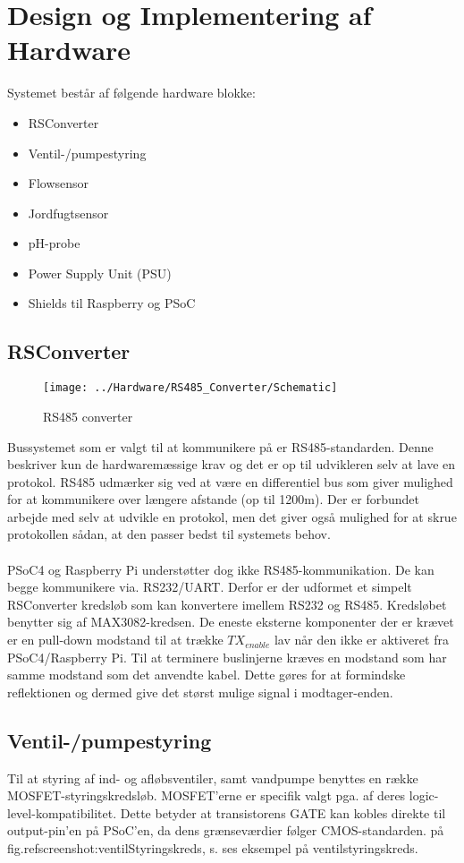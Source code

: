 \section{Design og Implementering af Hardware}
Systemet består af følgende hardware blokke:
\begin{itemize}
\item RSConverter
\item Ventil-/pumpestyring
\item Flowsensor
\item Jordfugtsensor
\item pH-probe
\item Power Supply Unit (PSU)
\item Shields til Raspberry og PSoC
\end{itemize}

\subsection{RSConverter}
\begin{figure}[H]
	\centering
	\texttt{[image: ../Hardware/RS485\_Converter/Schematic]}
	\caption{RS485 converter}
	\label{photo:RS485converter}
\end{figure}

Bussystemet som er valgt til at kommunikere på er RS485-standarden. Denne beskriver kun de hardwaremæssige krav og det er op til udvikleren selv at lave en protokol. RS485 udmærker sig ved at være en differentiel bus som giver mulighed for at kommunikere over længere afstande (op til 1200m). Der er forbundet arbejde med selv at udvikle en protokol, men det giver også mulighed for at skrue protokollen sådan, at den passer bedst til systemets behov.
\\\\
PSoC4 og Raspberry Pi understøtter dog ikke RS485-kommunikation. De kan begge kommunikere via. RS232/UART. Derfor er der udformet et simpelt RSConverter kredsløb som kan konvertere imellem RS232 og RS485. Kredsløbet benytter sig af MAX3082-kredsen. De eneste eksterne komponenter der er krævet er en pull-down modstand til at trække $TX_{enable}$ lav når den ikke er aktiveret fra PSoC4/Raspberry Pi. Til at terminere buslinjerne kræves en modstand som har samme modstand som det anvendte kabel. Dette gøres for at formindske reflektionen og dermed give det størst mulige signal i modtager-enden.

\subsection{Ventil-/pumpestyring}
Til at styring af ind- og afløbsventiler, samt vandpumpe benyttes en række MOSFET-styringskredsløb. MOSFET'erne er specifik valgt pga. af deres logic-level-kompatibilitet. Dette betyder at transistorens GATE kan kobles direkte til output-pin'en på PSoC'en, da dens grænseværdier følger CMOS-standarden. på fig.ref{screenshot:ventilStyringskreds}, s.\pageref{screenshot:ventilStyringskreds} ses eksempel på ventilstyringskreds.

